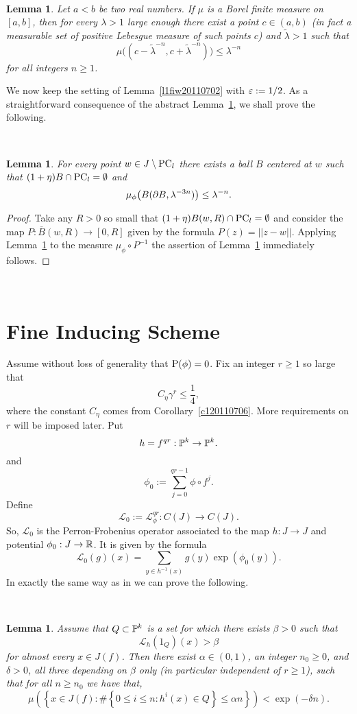 \documentclass[12pt]{amsart}
\numberwithin{equation}{section}
\newcommand{\beq}{\begin{equation}}
\newcommand{\eeq}{\end{equation}}
\newcommand{\blem}{\begin{lem}}
\newcommand{\elem}{\end{lem}}
\newcommand{\nl}{\newline}
\newtheorem{lem}[thm]{Lemma}
\def\L{{\mathcal L}}           \def\M{\mathcal M}        \def\Pa{{\mathcal P}}
\def\g{\gamma}                \def\Ga{\Gamma}           \def\l{\lambda}
\def\({\bigl(}                \def\){\bigr)}
\def\lt{\left}                \def\rt{\right}
\def\es{\emptyset}            \def\sms{\setminus}
\def\sbt{\subset}             \def\spt{\supset}
\def\sp{\medskip}             \def\fr{\noindent}        \def\nl{\newline}
\def\ov{\overline}            \def\un{\underline}
\begin{document}
\

\blem\label{l320110702}
Let $a<b$ be two real numbers. If $\mu$ is a Borel finite measure on
$[a,b]$, then for every $\l>1$ large enough there exist a point $c\in
(a,b)$ (in fact a measurable set of positive Lebesgue measure of such
points $c$) and $\tilde\l>1$ such that
$$
\mu\((c-\tilde\l^{-n},c+\tilde\l^{-n})\)\le \l^{-n}
$$
for all integers $n\ge 1$.
\elem

\sp\fr We now keep the setting of Lemma~\ref{l1fiw20110702} with $\e:=1/2$. As a
straightforward consequence of the abstract Lemma~\ref{l320110702}, we
shall prove the following.

\

\blem\label{l420110702}
For every point $w\in J\sms\PC_l$ there exists a ball $B$ centered at
$w$ such that $(1+\eta)B\cap\PC_l=\es$ and 
$$
\mu_\phi\(B(\bd B,\l^{-3n})\)\le\l^{-n}.
$$
\elem

\begin{proof}
Take any $R>0$ so small that $(1+\eta)B(w,R)\cap\PC_l=\es$ and consider
the map $P:\ov B(w,R)\to[0,R]$ given by the formula
$P(z)=||z-w||$. Applying Lemma~\ref{l320110702} to the measure
$\mu_\phi\circ P^{-1}$ the assertion of Lemma~\ref{l420110702} immediately
follows. 
\end{proof}

\

\section{Fine Inducing Scheme}\label{fis}

\sp\fr Assume without loss of generality that $\P(\phi)=0$. Fix an
integer $r\ge 1$ so large that
\beq\label{120110706}
C_\eta\g^r\le \frac14,
\eeq
where the constant $C_\eta$ comes from Corollary~\ref{c120110706}. More
requirements on $r$ will be imposed later. Put 
$$
h=f^{qr}:\Pk\to\Pk.
$$
and
$$
\phi_0:=\sum_{j=0}^{qr-1}\phi\circ f^j.
$$
Define
$$
\L_0:=\L_\phi^{qr}:C(J)\to C(J).
$$
So, $\L_0$ is the Perron-Frobenius operator associated to the map
$h:J\to J$ and potential $\phi_0:J\to\R$. It is given by the formula
$$
\L_0(g)(x)=\sum_{y\in h^{-1}(x)}g(y)\exp(\phi_0(y)).
$$
In exactly the same way as in \cite{uzpk} we can prove the following.

\

\begin{lem}\label{czest}
Assume that $Q\sbt\Pk$ is a set for which there exists $\beta>0$ such that 
\begin{equation}\label{frec}
\mathcal{L}_h(1_{Q})(x)>\beta
\end{equation}
for almost every $x\in J(f)$.
Then there exist $\alpha\in (0,1)$, an integer $n_0\ge 0$, and
$\delta>0$, all three depending on $\beta$ only (in particular
independent of $r\ge 1$), such that for all $n\ge n_0$ we have that,
\begin{equation}
\mu\lt(\lt\{x\in J(f):\#\left\{0\le i\le n: h^i(x)\in Q\right\} 
\le\alpha n\rt\}\rt)
<\exp(-\delta n).
\end{equation}
\end{lem}
\end{document}
